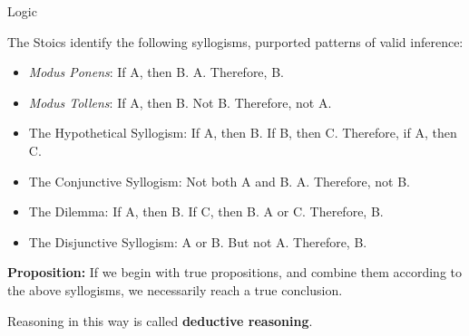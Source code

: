 \documentclass[8pt]{beamer}\usepackage[]{graphicx}\usepackage[]{color}
\begin{document}
\begin{frame}{Logic}

%
The Stoics identify the following syllogisms, purported patterns of
valid inference:
%
\begin{itemize}
%
\item \emph{Modus Ponens}: If A, then B.  A.  Therefore, B.
\item \emph{Modus Tollens}: If A, then B.  Not B.  Therefore, not A.
\item The Hypothetical Syllogism: If A, then B.  If B, then C.  Therefore, if A, then C.
\item The Conjunctive Syllogism: Not both A and B.  A.  Therefore, not B.
\item The Dilemma: If A, then B.  If C, then B.  A or C.  Therefore, B.
\item The Disjunctive Syllogism: A or B.  But not A.  Therefore, B.
%
\end{itemize}
%
\textbf{Proposition:} If we begin with true propositions, and combine
them according to the above syllogisms, we necessarily reach a true conclusion.

Reasoning in this way is called \textbf{deductive reasoning}.


%
%
\end{frame}


\end{document}

